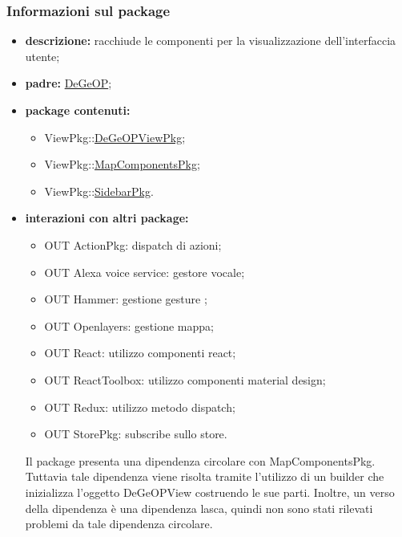 \subsubsection{Informazioni sul package}
\begin{itemize}
	\item \textbf{descrizione:} racchiude le componenti per la visualizzazione dell'interfaccia utente;
	\item \textbf{padre:} \hyperref[pkg::DeGeOP]{DeGeOP};
	\item \textbf{package contenuti:}
	\begin{itemize}
		\item ViewPkg::\hyperref[pkg::DeGeOPViewPkg]{DeGeOPViewPkg};
		\item ViewPkg::\hyperref[pkg::MapComponentsPkg]{MapComponentsPkg};
		\item ViewPkg::\hyperref[pkg::SidebarPkg]{SidebarPkg}.
	\end{itemize}
	
	\item \textbf{interazioni con altri package:} 
	\begin{itemize}
		\item OUT ActionPkg: dispatch di azioni;
		\item OUT Alexa voice service: gestore vocale;
		\item OUT Hammer: gestione gesture ;
		\item OUT Openlayers: gestione mappa;
		\item OUT React: utilizzo componenti react;
		\item OUT ReactToolbox: utilizzo componenti material design;
		\item OUT Redux: utilizzo metodo dispatch;
		\item OUT StorePkg: subscribe sullo store.
	\end{itemize}
	Il package presenta una dipendenza circolare con MapComponentsPkg. Tuttavia tale dipendenza viene risolta tramite l'utilizzo di un builder che inizializza l'oggetto DeGeOPView costruendo le sue parti. Inoltre, un verso della dipendenza è una dipendenza lasca, quindi non sono stati rilevati problemi da tale dipendenza circolare.
\end{itemize}
\newpage
